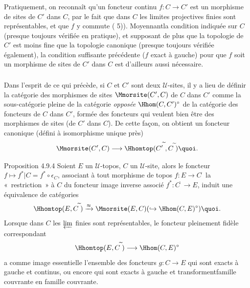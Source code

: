 \documentclass[10pt]{../fichiers-configuration-latex/smfart}
\begin{document}
\subsubsection{}
Pratiquement, on reconnaît qu'un foncteur continu $f:C\rightarrow
C'$ est un morphisme de sites de $C'$ dans $C$, par le fait que dans
$C$ les limites projectives finies sont représentables, et que $f$ y
commute ( 5)). Moyennant\pageoriginale la condition
indiquée sur $C$ (presque toujours vérifiée en pratique), et
supposant de plus que la topologie de $C'$ est moins fine que la
topologie canonique (presque toujours vérifiée également), la
condition suffisante précédente ($f$ exact à gauche) pour que $f$
soit un morphisme de sites de $C'$ dans $C$ est d'ailleurs aussi
nécessaire.

\subsubsection{}
Dans l'esprit de ce qui précède, si $C$ et $C'$ sont deux
$𝒰$-sites, il y a lieu de définir la catégorie des
morphismes de sites $\Mmorsite(C',C)$ de $C$ dans $C'$ comme la
sous-catégorie pleine de la catégorie \emph{opposée
$\Hhom(C,C')^{\circ}$} de la catégorie des foncteurs de $C$ dans
$C'$, formée des foncteurs qui veulent bien être des morphismes
de sites (de $C'$ dans $C$). De cette façon, on obtient un
foncteur canonique (défini à isomorphisme unique près)
$$
\Mmorsite(C',C)\longrightarrow
\Hhomtop({C'}^{\widetilde{\phantom{,}}},
C^{\widetilde{\phantom{,}}}){\quoi}.
$$

\begin{enonce*}{Proposition 4.9.4}
Soient $E$ un $𝒰$-topos, $C$ un $𝒰$-site, alors le
foncteur $f\mapsto f^{\ast}| C=f^{\ast}\circ \epsilon_{C}$,
associant à tout morphisme de topos $f:E\rightarrow
C^{\widetilde{\phantom{,}}}$ la « restriction »  à $C$ du
foncteur image inverse associé
$f^{\ast}:C^{\widetilde{\phantom{,}}}\rightarrow E$, induit une
équivalence de catégories
$$
\Hhomtop(E,C^{\widetilde{\phantom{,}}})\xrightarrow{\approx}\Mmorsite(E,C)(\hookrightarrow
\Hhom(C,E)^{\circ}){\quoi}.
$$
Lorsque dans $C$ les $\varprojlim$ finies sont représentables, le
foncteur pleinement fidèle correspondant
$$
\Hhomtop(E,C^{\widetilde{\phantom{,}}})\longrightarrow
\Hhom(C,E)^{\circ}
$$
a comme image essentielle l'ensemble des foncteurs $g:C\rightarrow
E$ qui sont exacts à gauche et continus, ou encore qui sont exacts
à gauche et transforment\pageoriginale famille couvrante en
famille couvrante.
\end{enonce*}
\end{document}
